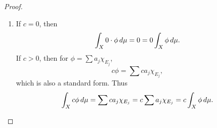 \documentclass[notoc,notitlepage]{tufte-book}
\begin{document}
\begin{proof}
  \begin{enumerate}
    \item If $c = 0$, then
      \begin{equation*}
        \int_{X} 0 \cdot \phi \mathop{}\!d{\mu} = 0 = 0 \int_{X} \phi \mathop{}\!d{\mu}.
      \end{equation*}
      If $c > 0$, then for $\phi = \sum a_j \chi_{E_j}$,
      \begin{equation*}
        c \phi = \sum c a_j \chi_{E_j},
      \end{equation*}
      which is also a standard form.
      Thus
      \begin{equation*}
        \int_{X} c \phi \mathop{}\!d{\mu}
         = \sum c a_j \chi_{E_j}
         = c \sum a_j \chi_{E_j}
         = c \int_{X} \phi \mathop{}\!d{\mu}.
      \end{equation*}


\end{enumerate}
\end{proof}
\end{document}
